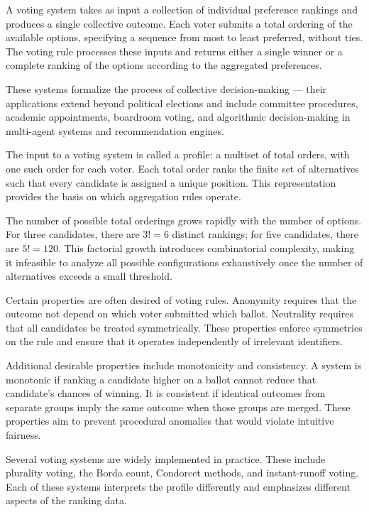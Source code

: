 A voting system takes as input a collection of individual preference rankings and produces a single collective outcome. Each voter submits a total ordering of the available options, specifying a sequence from most to least preferred, without ties. The voting rule processes these inputs and returns either a single winner or a complete ranking of the options according to the aggregated preferences.

These systems formalize the process of collective decision-making — their applications extend beyond political elections and include committee procedures, academic appointments, boardroom voting, and algorithmic decision-making in multi-agent systems and recommendation engines.

The input to a voting system is called a profile: a multiset of total orders, with one such order for each voter. Each total order ranks the finite set of alternatives such that every candidate is assigned a unique position. This representation provides the basis on which aggregation rules operate.

The number of possible total orderings grows rapidly with the number of options. For three candidates, there are $3! = 6$ distinct rankings; for five candidates, there are $5! = 120$. This factorial growth introduces combinatorial complexity, making it infeasible to analyze all possible configurations exhaustively once the number of alternatives exceeds a small threshold.

Certain properties are often desired of voting rules. Anonymity requires that the outcome not depend on which voter submitted which ballot. Neutrality requires that all candidates be treated symmetrically. These properties enforce symmetries on the rule and ensure that it operates independently of irrelevant identifiers.

Additional desirable properties include monotonicity and consistency. A system is monotonic if ranking a candidate higher on a ballot cannot reduce that candidate’s chances of winning. It is consistent if identical outcomes from separate groups imply the same outcome when those groups are merged. These properties aim to prevent procedural anomalies that would violate intuitive fairness.

Several voting systems are widely implemented in practice. These include plurality voting, the Borda count, Condorcet methods, and instant-runoff voting. Each of these systems interprets the profile differently and emphasizes different aspects of the ranking data.

